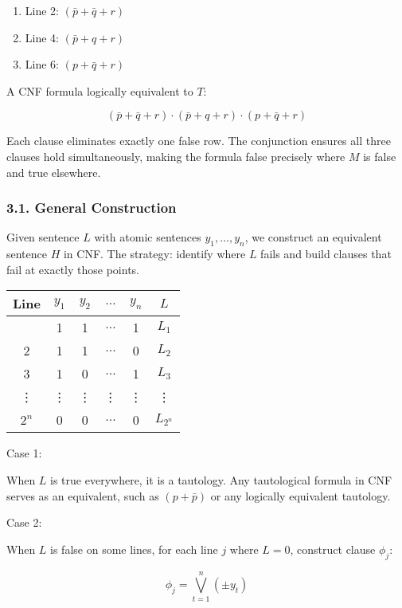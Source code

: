 \begin{enumerate}
\def\labelenumi{\arabic{enumi}.}
\tightlist
\item
  Line 2: \((\bar p + \bar q + r)\)
\item
  Line 4: \((\bar p + q + r)\)
\item
  Line 6: \((p + \bar q + r)\)
\end{enumerate}

A CNF formula logically equivalent to \(T\):

\[(\bar p + \bar q + r) \cdot (\bar p + q + r) \cdot (p + \bar q + r)\]

Each clause eliminates exactly one false row. The conjunction ensures
all three clauses hold simultaneously, making the formula false
precisely where \(M\) is false and true elsewhere.

\subsubsection{3.1. General Construction}\label{general-construction-2}

Given sentence \(L\) with atomic sentences \(y_1, \dots, y_n\), we
construct an equivalent sentence \(H\) in CNF. The strategy: identify
where \(L\) fails and build clauses that fail at exactly those points.

\begin{longtable}[]{@{}cccccc@{}}
\toprule\noalign{}
Line & \(y_1\) & \(y_2\) & \(\dots\) & \(y_n\) & \(L\) \\
\midrule\noalign{}
\endhead
\bottomrule\noalign{}
\endlastfoot
1 & 1 & 1 & \(\dots\) & 1 & \(L_1\) \\
2 & 1 & 1 & \(\dots\) & 0 & \(L_2\) \\
3 & 1 & 0 & \(\dots\) & 1 & \(L_3\) \\
⋮ & ⋮ & ⋮ & ⋮ & ⋮ & ⋮ \\
\(2^n\) & 0 & 0 & \(\dots\) & 0 & \(L_{2^n}\) \\
\end{longtable}

Case 1:

When \(L\) is true everywhere, it is a tautology. Any tautological
formula in CNF serves as an equivalent, such as \((p + \bar{p})\) or any
logically equivalent tautology.

Case 2:

When \(L\) is false on some lines, for each line \(j\) where \(L = 0\),
construct clause \(\phi_j\):

\[\phi_j = \displaystyle\bigvee_{t=1}^{n} (\pm y_t)\]


